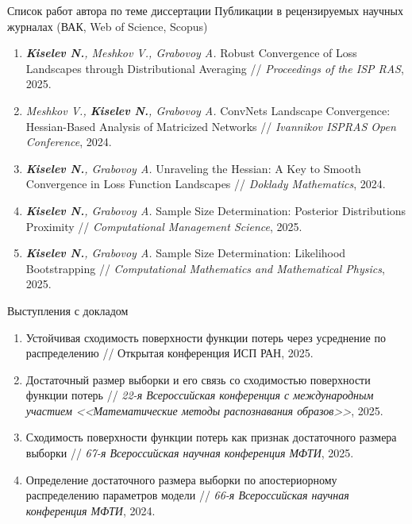 \documentclass[aspectratio=169]{beamer}
\begin{document}
\begin{frame}{Список работ автора по теме диссертации}
    \scriptsize
    { Публикации в рецензируемых научных журналах (ВАК, Web of Science, Scopus)}\\
    \begin{enumerate}
        \item \textit{\textbf{Kiselev N.}, Meshkov V., Grabovoy A.} Robust Convergence of Loss Landscapes through Distributional Averaging // \textit{Proceedings of the ISP RAS}, 2025.
        \item \textit{Meshkov V., \textbf{Kiselev N.}, Grabovoy A.} ConvNets Landscape Convergence: Hessian-Based Analysis of Matricized Networks // \textit{Ivannikov ISPRAS Open Conference}, 2024.
        \item \textit{\textbf{Kiselev N.}, Grabovoy A.} Unraveling the Hessian: A Key to Smooth Convergence in Loss Function Landscapes // \textit{Doklady Mathematics}, 2024.
        \item \textit{\textbf{Kiselev N.}, Grabovoy A.} Sample Size Determination: Posterior Distributions Proximity // 
        \textit{Computational Management Science}, 2025.
        \item \textit{\textbf{Kiselev N.}, Grabovoy A.} Sample Size Determination: Likelihood Bootstrapping // \textit{Computational Mathematics and Mathematical Physics}, 2025.
    \end{enumerate}
    { Выступления с докладом}\\
    \begin{enumerate}
        \item Устойчивая сходимость поверхности функции потерь через усреднение по распределению // Открытая конференция ИСП РАН, 2025.
        \item Достаточный размер выборки и его связь со сходимостью поверхности функции потерь // \textit{22-я Всероссийская конференция с международным участием <<Математические методы распознавания образов>>}, 2025.
        \item Сходимость поверхности функции потерь как признак достаточного размера выборки // \textit{67-я Всероссийская научная конференция МФТИ}, 2025.
        \item Определение достаточного размера выборки по апостериорному распределению параметров модели // \textit{66-я Всероссийская научная конференция МФТИ}, 2024.
    \end{enumerate}
\end{frame}
\end{document}
